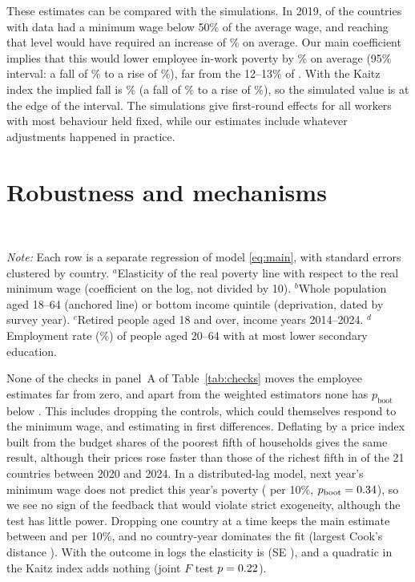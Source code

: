 \documentclass[10pt,a4paper]{article}
\newcommand{\pb}{p_{\text{boot}}}
\begin{document}
These estimates can be compared with the simulations. In 2019, \SimBelow{} of the \SimCountries{} countries with data had a minimum wage below 50\% of the average wage, and reaching that level would have required an increase of \SimIncrease\% on average. Our main coefficient implies that this would lower employee in-work poverty by \SimMw\% on average (95\% interval: a fall of \SimMwLo\% to a rise of \SimMwHi\%), far from the 12--13\% of \citet{grunberger2021}. With the Kaitz index the implied fall is \SimK\% (a fall of \SimKLo\% to a rise of \SimKHi\%), so the simulated value is at the edge of the interval. The simulations give first-round effects for all workers with most behaviour held fixed, while our estimates include whatever adjustments happened in practice.

\section{Robustness and mechanisms}\label{sec:robust}

\begin{table}[t]
\centering\footnotesize
\caption{Robustness checks and other outcomes (two-way FE with controls)}\label{tab:checks}
\setlength{\tabcolsep}{5pt}

\\[2pt]\parbox{0.96\textwidth}{\scriptsize\textit{Note:} Each row is a separate regression of model \eqref{eq:main}, with standard errors clustered by country. $^{a}$Elasticity of the real poverty line with respect to the real minimum wage (coefficient on the log, not divided by 10). $^{b}$Whole population aged 18--64 (anchored line) or bottom income quintile (deprivation, dated by survey year). $^{c}$Retired people aged 18 and over, income years 2014--2024. $^{d}$Employment rate (\%) of people aged 20--64 with at most lower secondary education.}
\end{table}

None of the checks in panel~A of Table~\ref{tab:checks} moves the employee estimates far from zero, and apart from the weighted estimators none has $\pb$ below \ChecksMinPboot. This includes dropping the controls, which could themselves respond to the minimum wage, and estimating in first differences. Deflating by a price index built from the budget shares of the poorest fifth of households gives the same result, although their prices rose faster than those of the richest fifth in \BasketCountries{} of the 21 countries between 2020 and 2024. In a distributed-lag model, next year's minimum wage does not predict this year's poverty (\LeadTen{} per 10\%, $\pb=\LeadTenPboot$), so we see no sign of the feedback that would violate strict exogeneity, although the test has little power. Dropping one country at a time keeps the main estimate between \LooMin{} and \LooMax{} per 10\%, and no country-year dominates the fit (largest Cook's distance \CookMax). With the outcome in logs the elasticity is \Elast{} (SE \ElastSe), and a quadratic in the Kaitz index adds nothing (joint $F$ test $p=0.22$).
\end{document}
